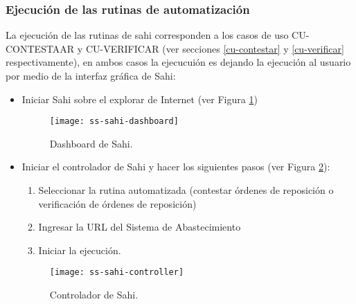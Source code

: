 \subsubsection{Ejecución de las rutinas de automatización}
La ejecución de las rutinas de sahi corresponden a los casos de uso CU-CONTESTAAR y 
CU-VERIFICAR (ver secciones \ref{cu-contestar} y \ref{cu-verificar} respectivamente), en ambos casos la ejecucuión es  
dejando la ejecución al usuario por medio de la interfaz gráfica de Sahi:
\begin{itemize}
	\item Iniciar Sahi sobre el explorar de Internet (ver Figura \ref{fig:ss-sahi-dashboard})
	\begin{figure}[h]
	\centering
	\texttt{[image: ss-sahi-dashboard]}
	\caption{Dashboard de Sahi.}
	\label{fig:ss-sahi-dashboard}
	\end{figure}

	\item Iniciar el controlador de Sahi y hacer los siguientes pasos (ver Figura \ref{fig:ss-sahi-controller}):
	\begin{enumerate}
		\item Seleccionar la rutina automatizada (contestar órdenes de reposición o verificación de órdenes de reposición)
		\item Ingresar la URL del Sistema de Abastecimiento
		\item Iniciar la ejecución.
	\end{enumerate}
	\begin{figure}[h]
	\centering
	\texttt{[image: ss-sahi-controller]}
	\caption{Controlador de Sahi.}
	\label{fig:ss-sahi-controller}
	\end{figure}
\end{itemize}


